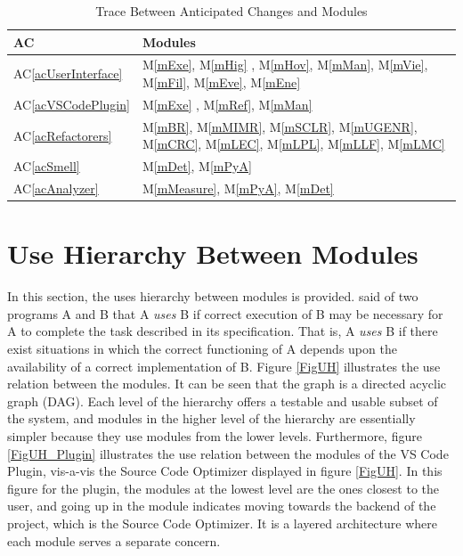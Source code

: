 \documentclass[12pt, titlepage]{article}
\newcommand{\acref}[1]{AC\ref{#1}}
\newcommand{\mref}[1]{M\ref{#1}}
\begin{document}
\begin{table}[H]
  \centering
  \begin{tabular}{p{} p{}}
  \toprule
  \textbf{AC} & \textbf{Modules}\\
  \midrule
  \acref{acUserInterface} & \mref{mExe}, \mref{mHig} , \mref{mHov}, \mref{mMan}, \mref{mVie}, \mref{mFil}, \mref{mEve}, \mref{mEne} \\
  \acref{acVSCodePlugin} & \mref{mExe} , \mref{mRef}, \mref{mMan} \\
  \acref{acRefactorers} & \mref{mBR}, \mref{mMIMR}, \mref{mSCLR}, \mref{mUGENR}, \mref{mCRC}, \mref{mLEC}, \mref{mLPL}, \mref{mLLF}, \mref{mLMC} \\
  \acref{acSmell} & \mref{mDet}, \mref{mPyA} \\
  \acref{acAnalyzer} & \mref{mMeasure}, \mref{mPyA}, \mref{mDet} \\
  \bottomrule
  \end{tabular}
  \caption{Trace Between Anticipated Changes and Modules}
  \label{TblACT}
\end{table}

\section{Use Hierarchy Between Modules} \label{SecUse}

In this section, the uses hierarchy between modules is
provided. \citet{Parnas1978} said of two programs A and B that A {\em uses} B if
correct execution of B may be necessary for A to complete the task described in
its specification. That is, A {\em uses} B if there exist situations in which
the correct functioning of A depends upon the availability of a correct
implementation of B.  Figure \ref{FigUH} illustrates the use relation between
the modules. It can be seen that the graph is a directed acyclic graph
(DAG). Each level of the hierarchy offers a testable and usable subset of the
system, and modules in the higher level of the hierarchy are essentially simpler
because they use modules from the lower levels. Furthermore, figure \ref{FigUH_Plugin} 
illustrates the use relation between the modules of the VS Code Plugin, vis-a-vis the Source Code 
Optimizer displayed in  figure \ref{FigUH}. In this figure for the plugin, the modules at the lowest 
level are the ones closest to the user, and going up in the module indicates moving towards
the backend of the project, which is the Source Code Optimizer. It is a layered architecture
where each module serves a separate concern.
\end{document}
